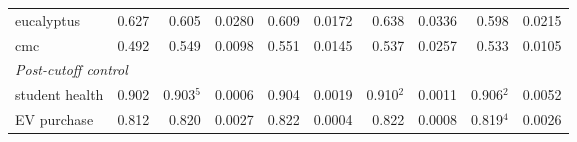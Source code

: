 \begin{table}[htbp]
\begin{tabular}{lrrrrrrrrr}
    eucalyptus & 0.627 & 0.605 & 0.0280 & 0.609 & 0.0172 & 0.638 & 0.0336 & 0.598 & 0.0215 \\
    cmc & 0.492 & 0.549 & 0.0098 & 0.551 & 0.0145 & 0.537 & 0.0257 & 0.533 & 0.0105 \\
    \midrule
    \multicolumn{10}{l}{\emph{Post-cutoff control}} \\
    student health & 0.902 & 0.903$^{5}$ & 0.0006 & 0.904 & 0.0019 & 0.910$^{2}$ & 0.0011 & 0.906$^{2}$ & 0.0052 \\
    EV purchase & 0.812 & 0.820 & 0.0027 & 0.822 & 0.0004 & 0.822 & 0.0008 & 0.819$^{4}$ & 0.0026 \\
    \bottomrule
  \end{tabular}
\end{table}
